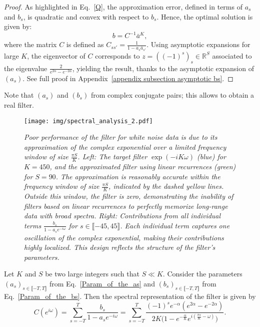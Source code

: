 \begin{proof}
As highlighted in Eq.~\eqref{Q}, the approximation error, defined in terms of $a_s$ and $b_s$, is quadratic and convex with respect to $b_s$. Hence, the optimal solution is given by:
\begin{equation}
b = C^{-1}\bar{a}^K,
\label{bs linear system inversion}    
\end{equation}
where the matrix $C$ is defined as $C_{ss'} = \frac{1}{1 - a_s \bar{a}_{s'}}$. Using asymptotic expansions for large $K$, the eigenvector of $C$ corresponds to $z = \left((-1)^s\right)_s \in \mathbb{R}^S$ associated to the eigenvalue $\frac{2}{e^{2\alpha}-e^{-2\alpha}}$, yielding the result, thanks to the asymptotic expansion of $(a_s)$. See full proof in Appendix~\ref{appendix subsection asymptotic bs}.
\end{proof}


Note that $(a_s)$ and $(b_s)$ from complex conjugate pairs; this allows to obtain a real filter.

\begin{figure}[!htb]
    \centering
    \texttt{[image: img/spectral\_analysis\_2.pdf]}

    \vspace*{-.3cm}
    
    \caption{\textit{Poor performance of the filter for white noise data is due to its approximation of the complex exponential over a limited frequency window of size $\frac{\pi S}{K}$. Left: The target filter $\exp(-iK\omega)$ (blue) for $K=450$, and the approximated filter using linear recurrences (green) for $S=90$. The approximation is reasonably accurate within the frequency window of size $\frac{\pi S}{K}$, indicated by the dashed yellow  lines. Outside this window, the filter is zero, demonstrating the inability of filters based on linear recurrences to perfectly memorize long-range data with broad spectra. Right: Contributions from all individual terms $\frac{b_s}{1 - a_s e^{-i\omega}}$ for $s\in\llbracket -45, 45 \rrbracket$. Each individual term captures one oscillation of the complex exponential, making their contributions highly localized. This design reflects the structure of the filter's parameters.}}
    \label{figure spectral analysis}
\end{figure}



\begin{lemma}\label{definition new filter}
    Let $K$ and $S$ be two large integers such that $S \ll K$. Consider the parameters $(a_s)_{s \in \llbracket -T, T \rrbracket}$ from Eq.~\eqref{Param_of_the_as} and $(b_s)_{s \in \llbracket -T, T \rrbracket}$ from Eq.~\eqref{Param_of_the_bs}. Then the spectral representation of the filter is given by
    \begin{equation*}
        C(e^{i \omega}) = \sum_{s=-T}^{T} \frac{b_s}{1 - a_s e^{-i\omega}} = \sum_{s=-T}^{T} \frac{(-1)^s e^{-\alpha}(e^{2\alpha} - e^{-2\alpha})}{2K \big(1 - e^{-\frac{\alpha}{K}} e^{i(\frac{\pi s}{K}-\omega)}\big)}.
    \end{equation*}
\end{lemma}


